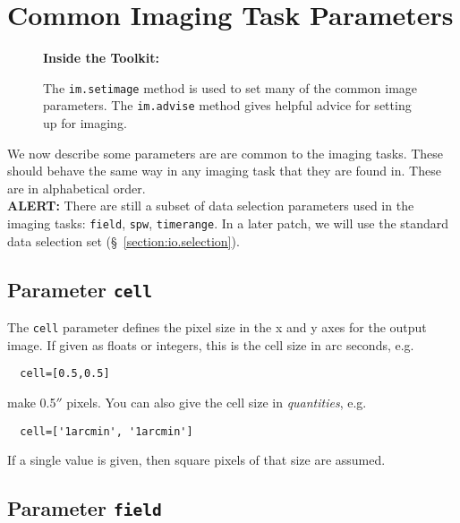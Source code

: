 \section{Common Imaging Task Parameters}
\label{section:im.pars}

\begin{wrapfigure}{r}{2.5in}
  \begin{boxedminipage}{2.5in}
     \centerline{\bf Inside the Toolkit:}
     The {\tt im.setimage} method is used to set many of the
     common image parameters.  The {\tt im.advise} method
     gives helpful advice for setting up for imaging.
  \end{boxedminipage}
\end{wrapfigure}

We now describe some parameters are are common to the imaging
tasks.  These should behave the same way in any imaging task
that they are found in.  These are in alphabetical order.\\[1cm]

{\bf ALERT:} There are still a subset of
data selection parameters used in the imaging tasks:
{\tt field}, {\tt spw}, {\tt timerange}.
In a later patch, we will use 
the standard data selection set (\S~\ref{section:io.selection}).



\subsection{Parameter {\tt cell} }
\label{section:im.pars.cell}

The {\tt cell} parameter defines the pixel size in the
x and y axes for the output
image.  If given as floats or integers, this is the cell size
in arc seconds, e.g.
\small
\begin{verbatim}
  cell=[0.5,0.5]
\end{verbatim}
\normalsize
make 0.5$''$ pixels.
You can also give the cell size in {\it quantities}, e.g.
\small
\begin{verbatim}
  cell=['1arcmin', '1arcmin']
\end{verbatim}
\normalsize
If a single value is given, then square pixels of that size
are assumed.

\subsection{Parameter {\tt field} }
\label{section:im.pars.field}

